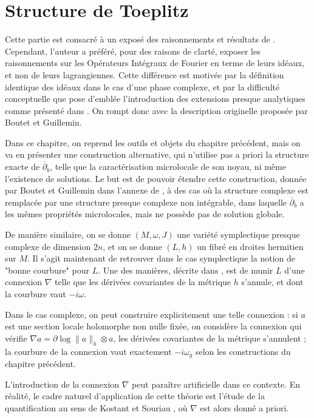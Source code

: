 \chapter{Structure de Toeplitz}

Cette partie est consacré à un exposé des raisonnements et résultats de \cite{Shiffman2002}. Cependant, l'auteur a préféré, pour des raisons de clarté, exposer les raisonnements sur les Opérateurs Intégraux de Fourier en terme de leurs idéaux, et non de leurs lagrangiennes. Cette différence est motivée par la définition identique des idéaux dans le cas d'une phase complexe, et par la difficulté conceptuelle que pose d'emblée l'introduction des extensions presque analytiques comme présenté dans \cite{melin1975fourier}. On rompt donc avec la description originelle proposée par Boutet et Guillemin.

Dans ce chapitre, on reprend les outils et objets du chapitre précédent, mais on va en présenter une construction alternative, qui n'utilise pas a priori la structure exacte de $\overline{\partial}_b$, telle que la caractérisation microlocale de son noyau, ni même l'existence de solutions. Le but est de pouvoir étendre cette construction, donnée par Boutet et Guillemin dans l'annexe de \cite{BoutetdeMonvel1981}, à des cas où la structure complexe est remplacée par une structure presque complexe non intégrable, dans laquelle $\overline{\partial}_b$ a les mêmes propriétés microlocales, mais ne possède pas de solution globale.

De manière similaire, on se donne $(M,\omega, J)$ une variété symplectique presque complexe de dimension $2n$, et on se donne $(L,h)$ un fibré en droites hermitien sur $M$. Il s'agit maintenant de retrouver dans le cas symplectique la notion de "bonne courbure" pour $L$. Une des manières, décrite dans \cite{woodhouse1997geometric}, est de munir $L$ d'une connexion $\nabla$ telle que les dérivées covariantes de la métrique $h$ s'annule, et dont la courbure vaut $-i\omega$. 

Dans le cas complexe, on peut construire explicitement une telle connexion : si $a$ est une section locale holomorphe non nulle fixée, on considère la connexion qui vérifie $\nabla a = \partial \log \|a\|_h \otimes a$, les dérivées covariantes de la métrique s'annulent ; la courbure de la connexion vaut exactement $-i\omega_g$ selon les constructions du chapitre précédent.

\begin{rem}L'introduction de la connexion $\nabla$ peut paraître artificielle dans ce contexte. En réalité, le cadre naturel d'application de cette théorie est l'étude de la quantification au sens de Kostant \cite{kostant1970quantization} et Souriau \cite{souriau1967quantification}, où $\nabla$ est alors donné a priori.\end{rem}

